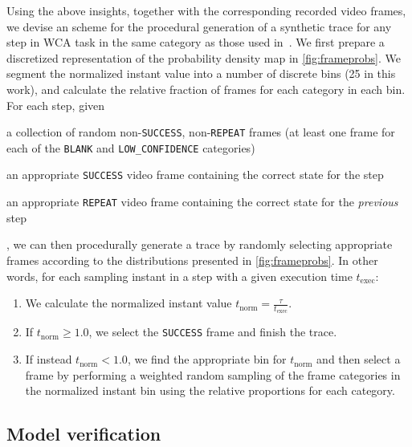 Using the above insights, together with the corresponding recorded video frames, we devise an scheme for the procedural generation of a synthetic trace for any step in \ac{WCA} task in the same category as those used in~\cite{olguinmunoz:impact2021}.
We first prepare a discretized representation of the probability density map in \cref{fig:frameprobs}.
We segment the normalized instant value into a number of discrete bins (\num{25} in this work), and calculate the relative fraction of frames for each category in each bin.
For each step, given
\begin{enumerate*}[itemjoin={{; }}, itemjoin*={{; and }}]
    \item a collection of random non-\texttt{SUCCESS}, non-\texttt{REPEAT} frames (at least one frame for each of the \texttt{BLANK} and \texttt{LOW\_CONFIDENCE} categories)
    \item an appropriate \texttt{SUCCESS} video frame containing the correct state for the step
    \item an appropriate \texttt{REPEAT} video frame containing the correct state for the \emph{previous} step
\end{enumerate*},
we can then procedurally generate a trace by randomly selecting appropriate frames according to the distributions presented in \cref{fig:frameprobs}.
In other words, for each sampling instant in a step with a given execution time \( t_\text{exec} \):
\begin{enumerate}
    \item We calculate the normalized instant value \( t_\text{norm} = \frac{\tau}{t_\text{exec}} \).
    \item If \( t_\text{norm} \ge 1.0 \), we select the \texttt{SUCCESS} frame and finish the trace.
    \item If instead \( t_\text{norm} < 1.0 \), we find the appropriate bin for \( t_\text{norm} \) and then select a frame by performing a weighted random sampling of the frame categories in the normalized instant bin using the relative proportions for each category.
\end{enumerate}

\subsection{Model verification}\label{ssec:model:verification}

